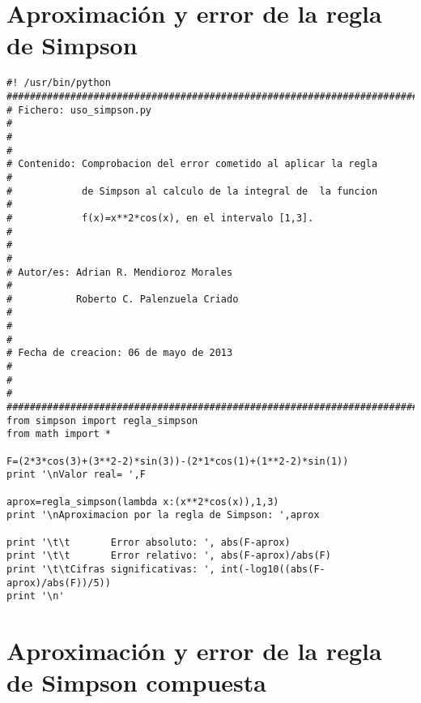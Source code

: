 \section{Aproximaci\'on y error de la regla de Simpson}
\label{Apendice3:error1}

\begin{center}
\begin{footnotesize}
\begin{verbatim}
#! /usr/bin/python
########################################################################
# Fichero: uso_simpson.py                                             #
#                                                                     #
# Contenido: Comprobacion del error cometido al aplicar la regla      #
#            de Simpson al calculo de la integral de  la funcion      #
#            f(x)=x**2*cos(x), en el intervalo [1,3].                 #
#                                                                     #
# Autor/es: Adrian R. Mendioroz Morales                               #
#           Roberto C. Palenzuela Criado                              #
#                                                                     #    
# Fecha de creacion: 06 de mayo de 2013                               # 
#                                                                     #      
########################################################################
from simpson import regla_simpson
from math import *

F=(2*3*cos(3)+(3**2-2)*sin(3))-(2*1*cos(1)+(1**2-2)*sin(1))
print '\nValor real= ',F

aprox=regla_simpson(lambda x:(x**2*cos(x)),1,3)
print '\nAproximacion por la regla de Simpson: ',aprox

print '\t\t       Error absoluto: ', abs(F-aprox)
print '\t\t       Error relativo: ', abs(F-aprox)/abs(F)
print '\t\tCifras significativas: ', int(-log10((abs(F-aprox)/abs(F))/5))
print '\n'
\end{verbatim}
\end{footnotesize}
\end{center}

\newpage

\section{Aproximaci\'on y error de la regla de Simpson compuesta}
\label{Apendice3:error2}

